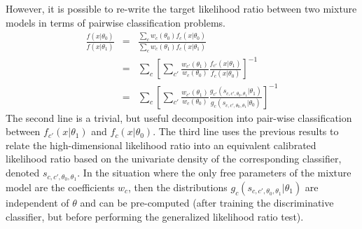 \documentclass[11pt, oneside]{article}   	%
\begin{document}
%

However, it is possible to re-write the target likelihood ratio between two mixture models in terms of pairwise classification problems. 
\begin{eqnarray}
\frac{f(x|\theta_0)}{f(x|\theta_1)} & =& \frac{\sum_c w_c(\theta_0) f_c(x| \theta_0)}{\sum_c w_c(\theta_1) f_c(x| \theta_1)} 
\\
&=& \sum_c \left[ \sum_{c'} \frac{ w_{c'}(\theta_1)}{w_c(\theta_0)} \frac{ f_{c'}(x| \theta_1)}{  f_c(x| \theta_0)}  \right]^{-1} \\
&=& \sum_c \left[ \sum_{c'} \frac{ w_{c'}(\theta_1)}{w_c(\theta_0)} \frac{ g_{c'}(s_{c,c',\theta_0, \theta_1}| \theta_1)}{ g_c(s_{c,c',\theta_0, \theta_1}| \theta_0)}  \right]^{-1} 
\end{eqnarray}
The second line is a trivial, but useful decomposition into pair-wise classification between $f_{c'}(x|\theta_1)$ and $f_c(x|\theta_0)$.  The third line uses the previous results to relate the high-dimensional likelihood ratio into an equivalent calibrated likelihood ratio based on the univariate density of the corresponding classifier, denoted $s_{c,c',\theta_0, \theta_1}$. In the situation where the only free parameters of the mixture model are the coefficients $w_c$, then the distributions $g_{c}(s_{c,c',\theta_0, \theta_1}| \theta_1)$ are independent of $\theta$ and can be pre-computed (after training the discriminative classifier, but before performing the generalized likelihood ratio test).
\end{document}
